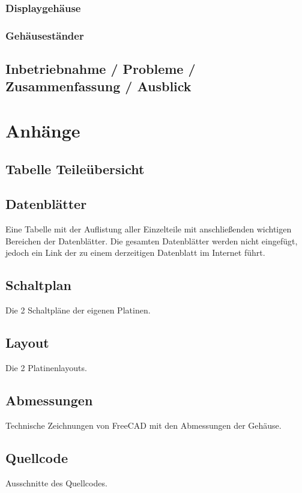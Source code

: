 \documentclass[11pt, titlepage, fleqn]{report}
\begin{document}
			\subsection{Displaygehäuse}
			\subsection{Gehäuseständer}
		\section{Inbetriebnahme / Probleme / Zusammenfassung / Ausblick}
	\chapter{Anhänge}
		\section{Tabelle Teileübersicht}
		\section{Datenblätter}
			Eine Tabelle mit der Auflistung aller Einzelteile mit anschließenden wichtigen Bereichen der Datenblätter.
			Die gesamten Datenblätter werden nicht eingefügt, jedoch ein Link der zu einem derzeitigen Datenblatt im Internet führt.
		\section{Schaltplan}
			Die 2 Schaltpläne der eigenen Platinen.
		\section{Layout}
			Die 2 Platinenlayouts.
		\section{Abmessungen}
			Technische Zeichnungen von FreeCAD mit den Abmessungen der Gehäuse.
		\section{Quellcode}
			Ausschnitte des Quellcodes.
	
\end{document}
